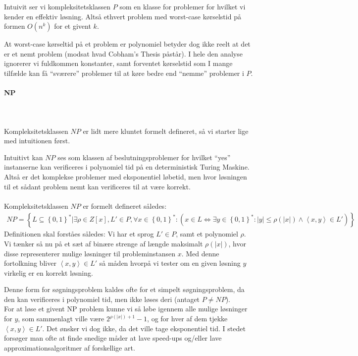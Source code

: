 Intuivit ser vi kompleksitetsklassen $P$ som en klasse for problemer for hvilket vi kender en effektiv løsning. Altså ethvert problem med worst-case kørselstid på formen $O(n^k)$ for et givent $k$.

At worst-case kørseltid på et problem er polynomiel betyder dog ikke reelt at det er et nemt problem (modsat hvad Cobham's Thesis påstår). I hele den analyse ignorerer vi fuldkommen konstanter, samt forventet kørselstid som I mange tilfælde kan få ``sværere'' problemer til at køre bedre end ``nemme'' problemer i $P$.


\paragraph{NP}
~\\
~\\
Kompleksitetsklassen $NP$ er lidt mere kluntet formelt defineret, så vi starter lige med intuitionen først.

Intuitivt kan $NP$ ses som klassen af beslutningsproblemer for hvilket ``yes'' instanserne kan verificeres i polynomiel tid på en deterministisk Turing Maskine. Altså er det komplekse problemer med eksponentiel løbetid, men hvor løsningen til et sådant problem nemt kan verificeres til at være korrekt.\\
~\\
Kompleksitetsklassen $NP$ er formelt defineret således:
\begin{align*}
 NP = \left\lbrace L \subseteq \left\lbrace 0,1 \right\rbrace^* | \exists \rho \in Z[x], L' \in P, \forall x \in \left\lbrace 0,1 \right\rbrace^* : ( x \in L \Leftrightarrow \exists y \in \left\lbrace 0,1 \right\rbrace^* : |y| \leq \rho(|x|) \wedge \left\langle x,y \right\rangle \in L') \right\rbrace
\end{align*}
Definitionen skal forståes således: Vi har et sprog $L' \in P$, samt et polynomiel $\rho$. Vi tænker så nu på et sæt af binære strenge af længde maksimalt $\rho(|x|)$, hvor disse representerer mulige løsninger til probleminstansen $x$. Med denne fortolkning bliver $\left\langle x,y \right\rangle \in L'$ så måden hvorpå vi tester om en given løsning $y$ virkelig er en korrekt løsning. 

Denne form for søgningsproblem kaldes ofte for et simpelt søgningsproblem, da den kan verificeres i polynomiel tid, men ikke løses deri (antaget $P \neq NP$).\\

For at løse et givent NP problem kunne vi så løbe igennem alle mulige løsninger for $y$, som sammenlagt ville være $2^{\rho(|x|)+1}-1$, og for hver af dem tjekke $\left\langle x,y \right\rangle \in L'$. Det ønsker vi dog ikke, da det ville tage eksponentiel tid. I stedet forsøger man ofte at finde snedige måder at lave speed-ups og/eller lave approximationsalgoritmer af forskellige art.

